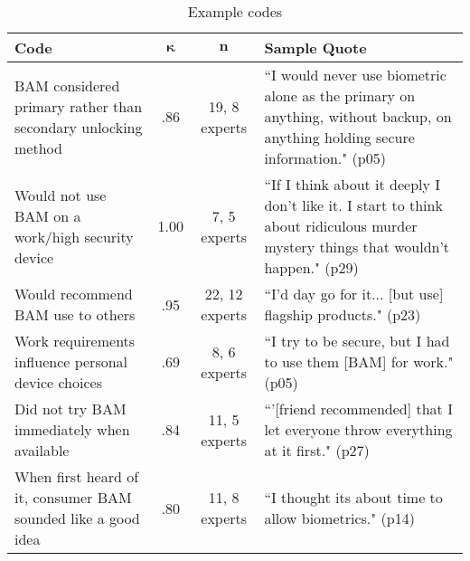 \begin{table*}[htbp]
\scriptsize
    \centering
    \setlength{\extrarowsep}{6pt}

\label{tab:example_codes}
\begin{tabular}{p{2in}| c | c| p{2.5in}}
    {\bf Code} & $\boldsymbol{\kappa}$ & $\boldsymbol{n}$ & {\bf Sample Quote} \\ 
        \hline 
BAM considered primary rather than secondary unlocking method & .86 & 19, 8 experts & ``I would never use biometric alone as the primary on anything, without backup, on anything holding secure information." (p05) \\ \hline
Would not use BAM on a work/high security device & 1.00 & 7, 5 experts & ``If I think about it deeply I don't like it. I start to think about ridiculous murder mystery things that wouldn't happen." (p29) \\ \hline
Would recommend BAM use to others & .95 & 22, 12 experts & ``I'd day go for it... [but use] flagship products." (p23) \\ \hline
Work requirements influence personal device choices & .69 & 8, 6 experts & ``I try to be secure, but I had to use them [BAM] for work." (p05) \\ \hline
Did not try BAM immediately when available & .84 & 11, 5 experts & ``'[friend recommended] that I let everyone throw everything at it first." (p27) \\ \hline
When first heard of it, consumer BAM sounded like a good idea & .80 & 11, 8 experts &``I thought its about time to allow biometrics." (p14) \\ \hline


    \end{tabular}
    \caption{Example codes}
\end{table*}


